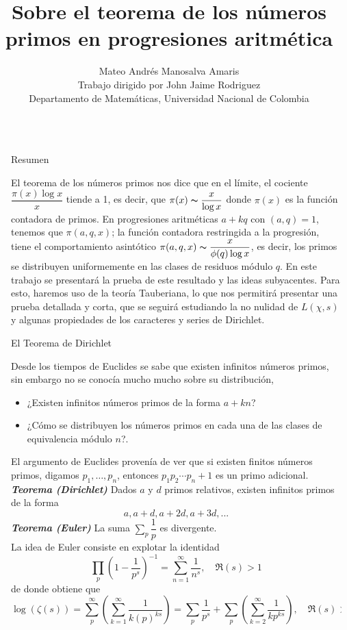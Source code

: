\documentclass[final]{beamer}
\title{Sobre el teorema de los números primos en progresiones aritmética}
\author{Mateo Andrés Manosalva Amaris\\Trabajo dirigido por John Jaime Rodriguez\\Departamento de Matemáticas, Universidad Nacional de Colombia}
\newlength{\sepwidth}
\newlength{\colwidth}
\newcommand{\separatorcolumn}{\begin{column}{\sepwidth}\end{column}}
\newcommand{\defi}[1]{\textbf{\emph{#1}}}
\begin{document}
\begin{frame}[t,fragile]
\begin{columns}[t]
\separatorcolumn

\begin{column}{\colwidth}

  \begin{block}{Resumen}

El teorema de los números primos nos dice que en el límite, el cociente $\dfrac{\pi(x)\log x}{x}$ tiende a 1, es decir, que $\pi(x)\thicksim \dfrac{x}{\log x}$ donde $\pi(x)$ es la función contadora de primos. En progresiones aritméticas $a+kq$ con $(a,q)=1$, tenemos que $\pi(a,q,x)$; la función contadora restringida a la progresión, tiene el comportamiento asintótico $\pi(a,q,x)\thicksim \dfrac{x}{\phi(q)\log x}$, es decir, los primos se distribuyen uniformemente en las clases de residuos módulo $q$. En este trabajo se presentará la prueba de este resultado y las ideas subyacentes. Para esto, haremos uso de la teoría Tauberiana, lo que nos permitirá presentar una prueba detallada y corta, que se seguirá estudiando la no nulidad de $L(\chi,s)$ y algunas propiedades de los caracteres y series de Dirichlet.
  \end{block}

\begin{block}{El Teorema de Dirichlet}

Desde los tiempos de Euclides se sabe que existen infinitos números primos, sin embargo no se conocía mucho mucho sobre su distribución,
\begin{itemize}
    \item  ¿Existen infinitos números primos de la forma $a+kn$?
    \item ¿Cómo se distribuyen los números primos en cada  una de las clases de equivalencia módulo $n$?.
\end{itemize}
El argumento de Euclides provenía de ver que si existen finitos números primos, digamos $p_1,\ldots,p_n$, entonces $p_1p_2\cdots p_n+1$ es un primo adicional.\\
\vspace*{0.3cm}
\defi{Teorema (Dirichlet)}
Dados $a$ y $d$ primos relativos, existen infinitos primos de la forma
    $$a, a+d,a+2d,a+3d,...$$
\defi{Teorema (Euler)} La suma $\displaystyle  \sum_{p}\dfrac{1}{p}$ es divergente.\\

La idea de Euler consiste en explotar la identidad 
$$\prod_p \left(1-\dfrac{1}{p^s}\right)^{-1}=\sum_{n=1}^{\infty}\dfrac{1}{n^s},\quad  \Re(s)>1$$
de donde obtiene que 
    $$
\log (\zeta(s))=\sum_p^{\infty}\left(\displaystyle\sum_{k=1}^{\infty} \dfrac{1}{k(p)^{k s}}\right)=\sum_p
\dfrac{1}{p^s}+\sum_{p}\left(\sum_{k=2}^{\infty}\dfrac{1}{kp^{ks}}\right), \quad \Re(s)>1$$
\end{block}
    

\end{column}
\end{columns}
\end{frame}
\end{document}
